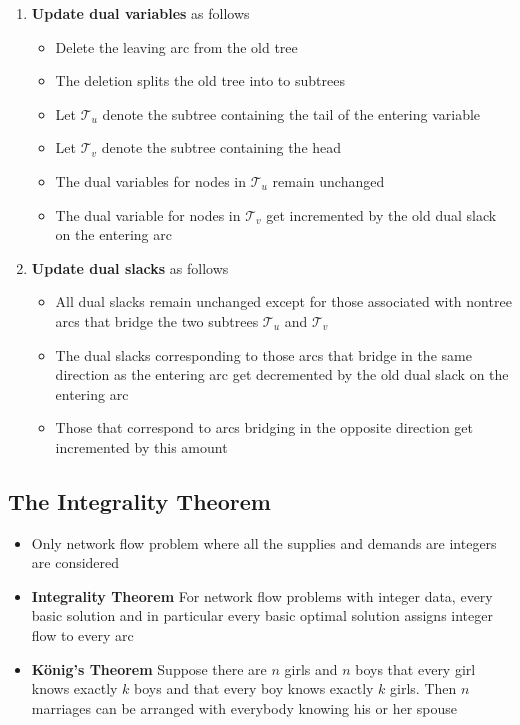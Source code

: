 \documentclass[11pt]{article}
\begin{document}
\begin{itemize}
\begin{enumerate}
\begin{itemize}
\end{itemize}
\item \textbf{Update dual variables} as follows
\begin{itemize}
\item Delete the leaving arc from the old tree
\item The deletion splits the old tree into to subtrees
\item Let \(\mathcal T_u\) denote the subtree containing the tail of the entering variable
\item Let \(\mathcal T_v\) denote the subtree containing the head
\item The dual variables for nodes in \(\mathcal T_u\) remain unchanged
\item The dual variable for nodes in \(\mathcal T_v\) get incremented by the old dual slack on the entering arc
\end{itemize}
\item \textbf{Update dual slacks} as follows
\begin{itemize}
\item All dual slacks remain unchanged except for those associated with nontree arcs that bridge the two subtrees \(\mathcal T_u\) and \(\mathcal T_v\)
\item The dual slacks corresponding to those arcs that bridge in the same direction as the entering arc get decremented by the old dual slack on the entering arc
\item Those that correspond to arcs bridging in the opposite direction get incremented by this amount
\end{itemize}
\end{enumerate}
\end{itemize}

\subsection{The Integrality Theorem}
\label{sec:org1ce1d3a}
\begin{itemize}
\item Only network flow problem where all the supplies and demands are integers are considered
\item \textbf{Integrality Theorem} For network flow problems with integer data, every basic solution and in particular every basic optimal solution assigns integer flow to every arc
\item \textbf{König's Theorem} Suppose there are \(n\) girls and \(n\) boys that every girl knows exactly \(k\) boys and that every boy knows exactly \(k\) girls. Then \(n\) marriages can be arranged with everybody knowing his or her spouse
\end{itemize}
\end{document}
